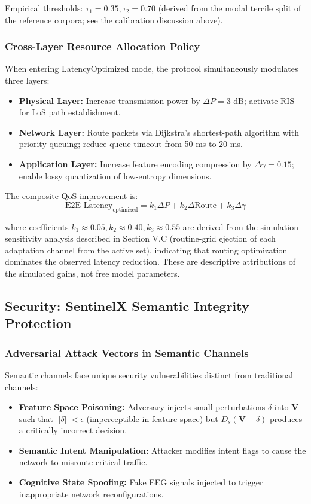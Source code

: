 \documentclass{BVP_CINC}
\begin{document}
Empirical thresholds: $\tau_1 = 0.35, \tau_2 = 0.70$ (derived from the modal tercile split of the reference corpora; see the calibration discussion above).

\subsubsection{Cross-Layer Resource Allocation Policy}
When entering LatencyOptimized mode, the protocol simultaneously modulates three layers:

\begin{itemize}
    \item \textbf{Physical Layer:} Increase transmission power by $\Delta P = 3$ dB; activate RIS for LoS path establishment.
    \item \textbf{Network Layer:} Route packets via Dijkstra's shortest-path algorithm with priority queuing; reduce queue timeout from 50 ms to 20 ms.
    \item \textbf{Application Layer:} Increase feature encoding compression by $\Delta \gamma = 0.15$; enable lossy quantization of low-entropy dimensions.
\end{itemize}

The composite QoS improvement is:
\begin{equation}
    \text{E2E\_Latency}_{\text{optimized}} = k_1 \Delta P + k_2 \Delta \text{Route} + k_3 \Delta\gamma
\end{equation}

where coefficients $k_1 \approx 0.05, k_2 \approx 0.40, k_3 \approx 0.55$ are derived from the simulation sensitivity analysis described in Section V.C (routine-grid ejection of each adaptation channel from the active set), indicating that routing optimization dominates the observed latency reduction. These are descriptive attributions of the simulated gains, not free model parameters.

\subsection{Security: SentinelX Semantic Integrity Protection}

\subsubsection{Adversarial Attack Vectors in Semantic Channels}
Semantic channels face unique security vulnerabilities distinct from traditional channels:
\begin{itemize}
    \item \textbf{Feature Space Poisoning:} Adversary injects small perturbations $\delta$ into $\mathbf{V}$ such that $||\delta|| < \epsilon$ (imperceptible in feature space) but $D_s(\mathbf{V} + \delta)$ produces a critically incorrect decision.
    \item \textbf{Semantic Intent Manipulation:} Attacker modifies intent flags to cause the network to misroute critical traffic.
    \item \textbf{Cognitive State Spoofing:} Fake EEG signals injected to trigger inappropriate network reconfigurations.
\end{itemize}
\end{document}
